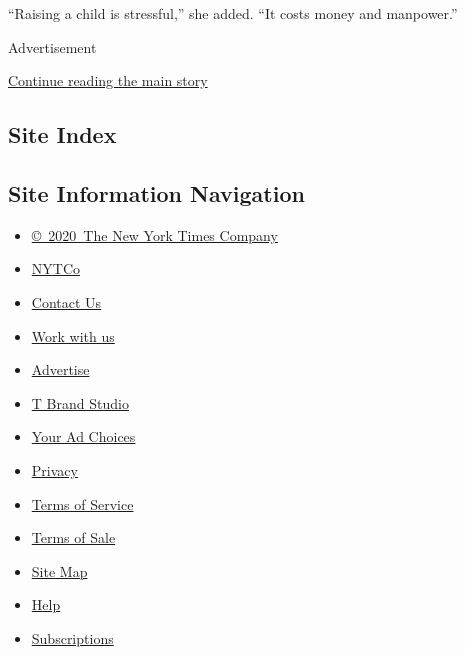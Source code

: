 ``Raising a child is stressful,'' she added. ``It costs money and
manpower.''

Advertisement

\protect\hyperlink{after-bottom}{Continue reading the main story}

\hypertarget{site-index}{%
\subsection{Site Index}\label{site-index}}

\hypertarget{site-information-navigation}{%
\subsection{Site Information
Navigation}\label{site-information-navigation}}

\begin{itemize}
\tightlist
\item
  \href{https://help.nytimes.com/hc/en-us/articles/115014792127-Copyright-notice}{©~2020~The
  New York Times Company}
\end{itemize}

\begin{itemize}
\tightlist
\item
  \href{https://www.nytco.com/}{NYTCo}
\item
  \href{https://help.nytimes.com/hc/en-us/articles/115015385887-Contact-Us}{Contact
  Us}
\item
  \href{https://www.nytco.com/careers/}{Work with us}
\item
  \href{https://nytmediakit.com/}{Advertise}
\item
  \href{http://www.tbrandstudio.com/}{T Brand Studio}
\item
  \href{https://www.nytimes.com/privacy/cookie-policy\#how-do-i-manage-trackers}{Your
  Ad Choices}
\item
  \href{https://www.nytimes.com/privacy}{Privacy}
\item
  \href{https://help.nytimes.com/hc/en-us/articles/115014893428-Terms-of-service}{Terms
  of Service}
\item
  \href{https://help.nytimes.com/hc/en-us/articles/115014893968-Terms-of-sale}{Terms
  of Sale}
\item
  \href{https://spiderbites.nytimes.com}{Site Map}
\item
  \href{https://help.nytimes.com/hc/en-us}{Help}
\item
  \href{https://www.nytimes.com/subscription?campaignId=37WXW}{Subscriptions}
\end{itemize}
